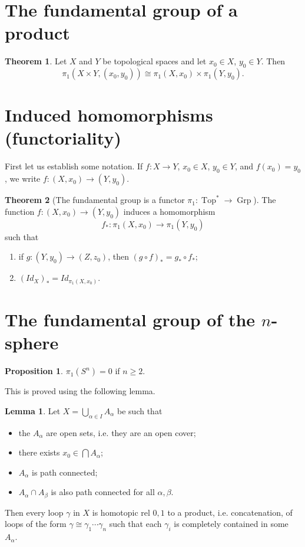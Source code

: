 \documentclass{book}
\theoremstyle{definition}
\newtheorem*{lema}{Lemma}
\newtheorem*{teo}{Theorem}
\newtheorem*{prop}{Proposition}
\DeclareMathOperator{\Top}{Top}
\DeclareMathOperator{\Grp}{Grp}
\begin{document}
\section{The fundamental group of a product}

\begin{teo}
Let $X$ and $Y$ be topological spaces and let $x_0\in X$,
$y_0\in Y$. Then
$$
\pi_1(X\times Y,(x_0,y_0))
\cong
\pi_1(X,x_0)\times\pi_1(Y,y_0).
$$
\end{teo}

\section{Induced homomorphisms (functoriality)}

First let us establish some notation. If $f:X\to Y$,
$x_0\in X$, $y_0\in Y$, and $f(x_0)=y_0$, we write
$f:(X,x_0)\to(Y,y_0)$.

\begin{teo}[The fundamental group is a functor
$\pi_1:\Top^*\to\Grp$]
The function $f:(X,x_0)\to(Y,y_0)$ induces a homomorphism
$$
f_*:\pi_1(X,x_0)\to\pi_1(Y,y_0)
$$
such that
\begin{enumerate}
\item if $g:(Y,y_0)\to(Z,z_0)$, then
$(g\circ f)_*=g_*\circ f_*$;
\item $(Id_X)_*=Id_{\pi_1(X,x_0)}$.
\end{enumerate}
\end{teo}

\section{The fundamental group of the $n$-sphere}

\begin{prop}
$\pi_1(S^n)=0$ if $n\geq2$.
\end{prop}

This is proved using the following lemma.

\begin{lema}\label{lema:homotopia}
Let $X=\bigcup_{\alpha\in I} A_\alpha$ be such that
\begin{itemize}
\item the $A_\alpha$ are open sets, i.e. they are an open
cover;
\item there exists $x_0\in\bigcap A_\alpha$;
\item $A_\alpha$ is path connected;
\item $A_\alpha\cap A_\beta$ is also path connected for all
$\alpha,\beta$.
\end{itemize}
Then every loop $\gamma$ in $X$ is homotopic rel $0,1$ to a
product, i.e. concatenation, of loops of the form
$\gamma\cong\gamma_1\cdots\gamma_n$ such that each
$\gamma_i$ is completely contained in some $A_\alpha$.
\end{lema}
\end{document}
